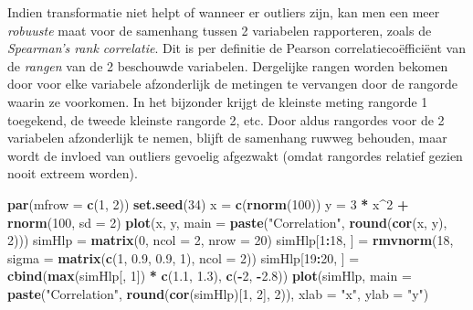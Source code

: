 \documentclass[12pt,dutch,coursenotes]{book}
\newenvironment{Shaded}{\begin{snugshade}}{\end{snugshade}}
\newcommand{\KeywordTok}[1]{\textcolor[rgb]{0.13,0.29,0.53}{\textbf{#1}}}
\newcommand{\DataTypeTok}[1]{\textcolor[rgb]{0.13,0.29,0.53}{#1}}
\newcommand{\DecValTok}[1]{\textcolor[rgb]{0.00,0.00,0.81}{#1}}
\newcommand{\FloatTok}[1]{\textcolor[rgb]{0.00,0.00,0.81}{#1}}
\newcommand{\StringTok}[1]{\textcolor[rgb]{0.31,0.60,0.02}{#1}}
\newcommand{\OperatorTok}[1]{\textcolor[rgb]{0.81,0.36,0.00}{\textbf{#1}}}
\newcommand{\NormalTok}[1]{#1}
\theoremstyle{definition}
\theoremstyle{definition}
\theoremstyle{definition}
\theoremstyle{remark}
\begin{document}
Indien transformatie niet helpt of wanneer er outliers zijn, kan men een
meer \emph{robuuste} maat voor de samenhang tussen 2 variabelen
rapporteren, zoals de \emph{Spearman's rank correlatie}. Dit is per
definitie de Pearson correlatiecoëfficiënt van de \emph{rangen} van de 2
beschouwde variabelen. Dergelijke rangen worden bekomen door voor elke
variabele afzonderlijk de metingen te vervangen door de rangorde waarin
ze voorkomen. In het bijzonder krijgt de kleinste meting rangorde 1
toegekend, de tweede kleinste rangorde 2, etc. Door aldus rangordes voor
de 2 variabelen afzonderlijk te nemen, blijft de samenhang ruwweg
behouden, maar wordt de invloed van outliers gevoelig afgezwakt (omdat
rangordes relatief gezien nooit extreem worden).

\begin{Shaded}
\begin{Highlighting}[]
\KeywordTok{par}\NormalTok{(}\DataTypeTok{mfrow =} \KeywordTok{c}\NormalTok{(}\DecValTok{1}\NormalTok{, }\DecValTok{2}\NormalTok{))}
\KeywordTok{set.seed}\NormalTok{(}\DecValTok{34}\NormalTok{)}
\NormalTok{x =}\StringTok{ }\KeywordTok{c}\NormalTok{(}\KeywordTok{rnorm}\NormalTok{(}\DecValTok{100}\NormalTok{))}
\NormalTok{y =}\StringTok{ }\DecValTok{3} \OperatorTok{*}\StringTok{ }\NormalTok{x}\OperatorTok{^}\DecValTok{2} \OperatorTok{+}\StringTok{ }\KeywordTok{rnorm}\NormalTok{(}\DecValTok{100}\NormalTok{, }\DataTypeTok{sd =} \DecValTok{2}\NormalTok{)}
\KeywordTok{plot}\NormalTok{(x, y, }\DataTypeTok{main =} \KeywordTok{paste}\NormalTok{(}\StringTok{"Correlation"}\NormalTok{, }\KeywordTok{round}\NormalTok{(}\KeywordTok{cor}\NormalTok{(x, }
\NormalTok{    y), }\DecValTok{2}\NormalTok{)))}
\NormalTok{simHlp =}\StringTok{ }\KeywordTok{matrix}\NormalTok{(}\DecValTok{0}\NormalTok{, }\DataTypeTok{ncol =} \DecValTok{2}\NormalTok{, }\DataTypeTok{nrow =} \DecValTok{20}\NormalTok{)}
\NormalTok{simHlp[}\DecValTok{1}\OperatorTok{:}\DecValTok{18}\NormalTok{, ] =}\StringTok{ }\KeywordTok{rmvnorm}\NormalTok{(}\DecValTok{18}\NormalTok{, }\DataTypeTok{sigma =} \KeywordTok{matrix}\NormalTok{(}\KeywordTok{c}\NormalTok{(}\DecValTok{1}\NormalTok{, }\FloatTok{0.9}\NormalTok{, }
    \FloatTok{0.9}\NormalTok{, }\DecValTok{1}\NormalTok{), }\DataTypeTok{ncol =} \DecValTok{2}\NormalTok{))}
\NormalTok{simHlp[}\DecValTok{19}\OperatorTok{:}\DecValTok{20}\NormalTok{, ] =}\StringTok{ }\KeywordTok{cbind}\NormalTok{(}\KeywordTok{max}\NormalTok{(simHlp[, }\DecValTok{1}\NormalTok{]) }\OperatorTok{*}\StringTok{ }\KeywordTok{c}\NormalTok{(}\FloatTok{1.1}\NormalTok{, }\FloatTok{1.3}\NormalTok{), }
    \KeywordTok{c}\NormalTok{(}\OperatorTok{-}\DecValTok{2}\NormalTok{, }\OperatorTok{-}\FloatTok{2.8}\NormalTok{))}
\KeywordTok{plot}\NormalTok{(simHlp, }\DataTypeTok{main =} \KeywordTok{paste}\NormalTok{(}\StringTok{"Correlation"}\NormalTok{, }\KeywordTok{round}\NormalTok{(}\KeywordTok{cor}\NormalTok{(simHlp)[}\DecValTok{1}\NormalTok{, }
    \DecValTok{2}\NormalTok{], }\DecValTok{2}\NormalTok{)), }\DataTypeTok{xlab =} \StringTok{"x"}\NormalTok{, }\DataTypeTok{ylab =} \StringTok{"y"}\NormalTok{)}
\end{Highlighting}
\end{Shaded}
\end{document}
